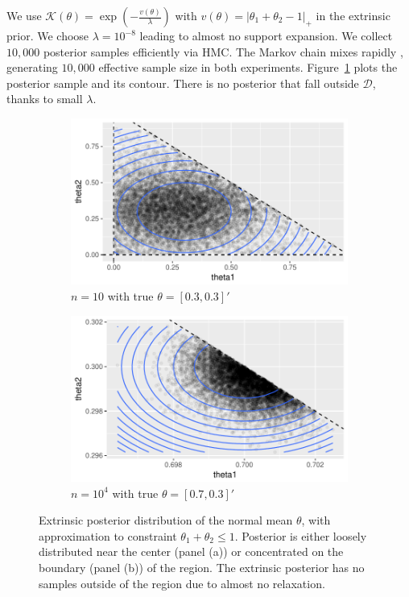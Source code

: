 \documentclass[10pt]{article}
\newcommand{\mc}[1]{\mathcal{#1}}
\DeclareMathOperator{\1}{\mathbbm{1}}
\begin{document}
We use $\mc K(\theta)=\exp( - \frac{v(\theta)}{\lambda})$ with $v(\theta)=|\theta_1+\theta_2-1|_{+}$ in the extrinsic prior. We choose $\lambda=10^{-8}$ leading to almost no support expansion. We collect $10,000$ posterior samples efficiently via HMC. The Markov chain mixes rapidly , generating $10,000$ effective sample size in both experiments. Figure~\ref{linear_inequality} plots the posterior sample and its contour. There is no posterior that fall outside $\mc D$, thanks to small $\lambda$.

\begin{figure}[H]
   \begin{subfigure}[b]{0.45\textwidth}
    \includegraphics[width=1\textwidth]{linear_inequal_1}
    \caption{$n=10$ with true $\theta=[0.3,0.3]'$}
	\end{subfigure}
    \begin{subfigure}[b]{0.45\textwidth}
     \includegraphics[width=1\textwidth]{linear_inequal_2}
     \caption{$n=10^4$ with true $\theta=[0.7,0.3]'$}
     	\end{subfigure}
\caption{Extrinsic posterior distribution of the normal mean $\theta$, with approximation to constraint $\theta_1+\theta_2\le 1$. Posterior is either loosely distributed near the center (panel (a)) or concentrated on the boundary (panel (b)) of the region. The extrinsic posterior has no samples outside of the region due to almost no relaxation.}
\label{linear_inequality}
\end{figure}
\end{document}
